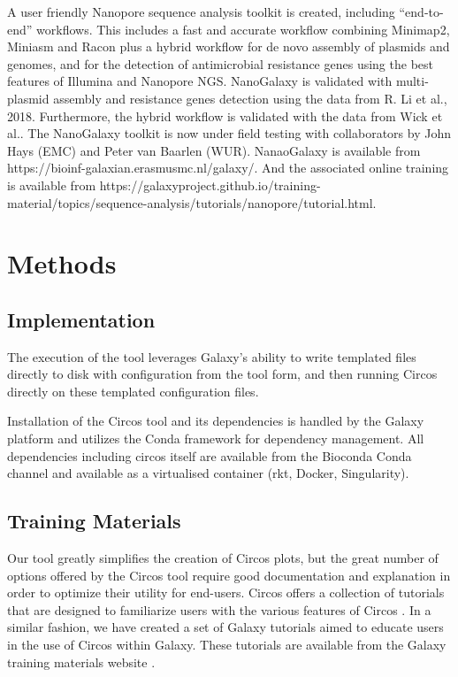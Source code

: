 \documentclass[a4paper,num-refs]{oup-contemporary}
\begin{document}
A user friendly Nanopore sequence analysis toolkit is created, including “end-to-end” workflows. This includes a fast and accurate workflow combining Minimap2, Miniasm and Racon plus a hybrid workflow for de novo assembly of plasmids and genomes, and for the detection of antimicrobial resistance genes using the best features of Illumina and Nanopore NGS. NanoGalaxy is validated with multi-plasmid assembly and resistance genes detection using the data from R. Li et al., 2018. Furthermore, the hybrid workflow is validated with the data from Wick et al.. The NanoGalaxy toolkit is now under field testing with collaborators by John Hays (EMC) and Peter van Baarlen (WUR). NanaoGalaxy is available from https://bioinf-galaxian.erasmusmc.nl/galaxy/. And the associated online training is available from https://galaxyproject.github.io/training-material/topics/sequence-analysis/tutorials/nanopore/tutorial.html.


\section{Methods}
\subsection{Implementation}
The execution of the tool leverages Galaxy's ability to write templated files directly to disk with configuration from the tool form, and then running Circos directly on these templated configuration files.

Installation of the Circos tool and its dependencies is handled by the Galaxy platform and utilizes the Conda framework for dependency management. All dependencies including circos itself are available from the Bioconda Conda channel \cite{gruning2018bioconda} and available as a virtualised container (rkt, Docker, Singularity).



\subsection{Training Materials}
Our tool greatly simplifies the creation of Circos plots, but the great number of options offered by the Circos tool require good documentation and explanation in order to optimize their utility for end-users. Circos offers a collection of tutorials that are designed to familiarize users with the various features of Circos \cite{circostutorials}. In a similar fashion, we have created a set of Galaxy tutorials aimed to educate users in the use of Circos within Galaxy. These tutorials are available from the Galaxy training materials website \cite{Batut2018}.
\end{document}
